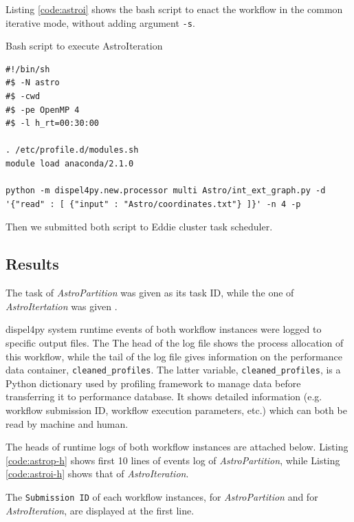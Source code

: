 \documentclass[10pt,twoside,openright,logo]{report}
\begin{document}
Listing \ref{code:astroi} shows the bash script to enact the workflow in the common iterative mode, without adding argument \texttt{-s}.
\begin{listing}
\caption{Bash script to execute AstroIteration}
\label{code:astroi}
\begin{verbatim}
#!/bin/sh
#$ -N astro
#$ -cwd
#$ -pe OpenMP 4
#$ -l h_rt=00:30:00

. /etc/profile.d/modules.sh
module load anaconda/2.1.0

python -m dispel4py.new.processor multi Astro/int_ext_graph.py -d '{"read" : [ {"input" : "Astro/coordinates.txt"} ]}' -n 4 -p
\end{verbatim}
\end{listing}

Then we submitted both script to Eddie cluster task scheduler.

\subsection{Results}
The task of \textit{AstroPartition} was given {\footnotesize{}} as its task ID, while the one of \textit{AstroItertation} was given {\footnotesize{}}.

dispel4py system runtime events of both workflow instances were logged to specific output files. The
The head of the log file shows the process allocation of this workflow, while the tail of the log file gives information on the performance data container, \texttt{cleaned_profiles}. The latter variable, \texttt{cleaned_profiles}, is a Python dictionary used by profiling framework to manage data before transferring it to performance database. It shows detailed information (e.g. workflow submission ID, workflow execution parameters, etc.) which can both be read by machine and human.

The heads of runtime logs of both workflow instances are attached below. Listing \ref{code:astrop-h} shows first 10 lines of events log of \textit{AstroPartition}, while Listing \ref{code:astroi-h} shows that of \textit{AstroIteration}.

The \texttt{Submission ID} of each workflow instances, {\footnotesize{}} for \textit{AstroPartition} and {\footnotesize{}} for \textit{AstroIteration}, are displayed at the first line.
\end{document}
